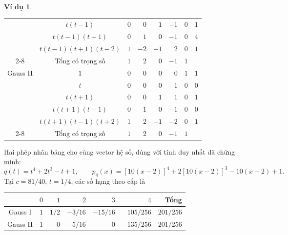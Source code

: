 \documentclass[12pt,a4paper,oneside]{book}
\numberwithin{algorithm}{chapter}
\theoremstyle{definition}
\newtheorem{vidu}{Ví dụ}[chapter]
\begin{document}
\begin{vidu}
\begin{center}
\begin{tabular}{c|c|rrrrr|r}
&$t(t-1)$&$0$&$0$&$1$&$-1$&$0$&$1$\\
&$t(t-1)(t+1)$&$0$&$1$&$0$&$-1$&$0$&$4$\\
&$t(t-1)(t+1)(t-2)$&$1$&$-2$&$-1$&$2$&$0$&$1$\\\cmidrule{2-8}
&Tổng có trọng số&$1$&$2$&$0$&$-1$&$1$&\\\midrule
Gauss II&$1$&$0$&$0$&$0$&$0$&$1$&$1$\\
&$t$&$0$&$0$&$0$&$1$&$0$&$0$\\
&$t(t+1)$&$0$&$0$&$1$&$1$&$0$&$1$\\
&$t(t+1)(t-1)$&$0$&$1$&$0$&$-1$&$0$&$0$\\
&$t(t+1)(t-1)(t+2)$&$1$&$2$&$-1$&$-2$&$0$&$1$\\\cmidrule{2-8}
&Tổng có trọng số&$1$&$2$&$0$&$-1$&$1$&\\\bottomrule
\end{tabular}
\end{center}
Hai phép nhân bảng cho cùng vector hệ số, đúng với tính duy nhất đã chứng minh:
\[
 q(t)=t^4+2t^3-t+1,\qquad
 p_4(x)=[10(x-2)]^4+2[10(x-2)]^3-10(x-2)+1.
\]
Tại $c=81/40$, $t=1/4$, các số hạng theo cấp là
\begin{center}
\begin{tabular}{c|rrrrr|r}\toprule
&$0$&$1$&$2$&$3$&$4$&Tổng\\\midrule
Gauss I&$1$&$1/2$&$-3/16$&$-15/16$&$105/256$&$201/256$\\
Gauss II&$1$&$0$&$5/16$&$0$&$-135/256$&$201/256$\\\bottomrule
\end{tabular}
\end{center}
\end{vidu}



\end{document}
